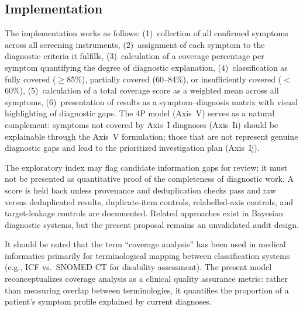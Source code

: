\documentclass[11pt,a4paper]{article}
\begin{document}
\subsection{Implementation}

The implementation works as follows: (1)~collection of all confirmed symptoms across all screening instruments, (2)~assignment of each symptom to the diagnostic criteria it fulfills, (3)~calculation of a coverage percentage per symptom quantifying the degree of diagnostic explanation, (4)~classification as fully covered ($\geq$85\%), partially covered (60--84\%), or insufficiently covered ($<$60\%), (5)~calculation of a total coverage score as a weighted mean across all symptoms, (6)~presentation of results as a symptom--diagnosis matrix with visual highlighting of diagnostic gaps. The 4P model (Axis~V) serves as a natural complement: symptoms not covered by Axis~I diagnoses (Axis~Ii) should be explainable through the Axis~V formulation; those that are not represent genuine diagnostic gaps and lead to the prioritized investigation plan (Axis~Ij).

The exploratory index may flag candidate information gaps for review; it must not be presented as quantitative proof of the completeness of diagnostic work. A score is held back unless provenance and deduplication checks pass and raw versus deduplicated results, duplicate-item controls, relabelled-axis controls, and target-leakage controls are documented. Related approaches exist in Bayesian diagnostic systems, but the present proposal remains an unvalidated audit design.

It should be noted that the term ``coverage analysis'' has been used in medical informatics primarily for terminological mapping between classification systems (e.g., ICF vs.\ SNOMED CT for disability assessment). The present model reconceptualizes coverage analysis as a clinical quality assurance metric: rather than measuring overlap between terminologies, it quantifies the proportion of a patient's symptom profile explained by current diagnoses.
\end{document}
